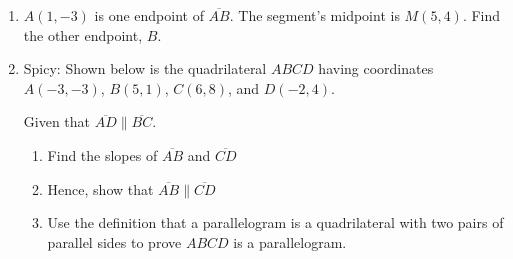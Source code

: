 \documentclass[12pt, twoside]{article}
\begin{document}
\begin{enumerate}
\item $A(1,-3)$ is one endpoint of $\overline{AB}$. The segment's midpoint is $M(5,4)$. Find the other endpoint, $B$. \vspace{3cm}

\newpage
\item Spicy: Shown below is the quadrilateral $ABCD$ having coordinates $A(-3,-3)$, $B(5,1)$, $C(6,8)$, and $D(-2,4)$.
  \begin{center} %
  \end{center}
  Given that $\overline{AD} \parallel \overline{BC}$. 
  \begin{enumerate}[itemsep=2cm]
    \item Find the slopes of $\overline{AB}$ and $\overline{CD}$\vspace{2cm}
    \item Hence, show that $\overline{AB} \parallel \overline{CD}$
    \item Use the definition that a parallelogram is a quadrilateral with two pairs of parallel sides to prove $ABCD$ is a parallelogram.
  \end{enumerate}

\end{enumerate}
\end{document}
